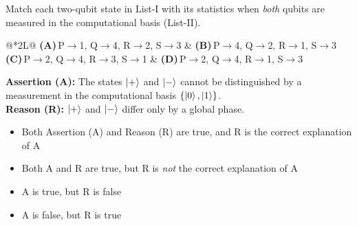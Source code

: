 \documentclass[11pt,a4paper]{article}
\newcommand{\optlabel}[1]{\textbf{(#1)}}
\newenvironment{qitem}[1]{\begin{list}{}{\setlength{\leftmargin}{3.3em}\setlength{\labelwidth}{3.1em}%
  \setlength{\labelsep}{0.2em}\setlength{\topsep}{3pt}\setlength{\parsep}{3pt}}\item[\textbf{Q.#1}\hfill]}{\end{list}}
\newcommand{\qsep}{\par\vspace{2pt}{\color{black!15}\hrule}\vspace{4pt}}
\begin{document}
\begin{qitem}{36}
Match each two-qubit state in List-I with its statistics when \emph{both} qubits are measured in the computational
basis (List-II).
\par\smallskip{}
\par\smallskip\noindent\begin{tabularx}{\linewidth}{@{}*{2}{L}@{}}
\optlabel{A}\,P$\to$1, Q$\to$4, R$\to$2, S$\to$3 & \optlabel{B}\,P$\to$4, Q$\to$2, R$\to$1, S$\to$3 \\[3pt]
\optlabel{C}\,P$\to$2, Q$\to$4, R$\to$3, S$\to$1 & \optlabel{D}\,P$\to$2, Q$\to$4, R$\to$1, S$\to$3
\end{tabularx}
\end{qitem}
\qsep

\begin{qitem}{37}
\textbf{Assertion (A):} The states $\ket{+}$ and $\ket{-}$ cannot be distinguished by a measurement in the computational
basis $\{\ket0, \ket1\}$.\\[1mm]
\textbf{Reason (R):} $\ket{+}$ and $\ket{-}$ differ only by a global phase.
\begin{itemize}[leftmargin=2.6em, labelsep=0.4em, itemsep=2pt, topsep=3pt]
\item[\optlabel{A}] Both Assertion (A) and Reason (R) are true, and R is the correct explanation of A
\item[\optlabel{B}] Both A and R are true, but R is \emph{not} the correct explanation of A
\item[\optlabel{C}] A is true, but R is false
\item[\optlabel{D}] A is false, but R is true
\end{itemize}
\end{qitem}
\qsep
\end{document}

